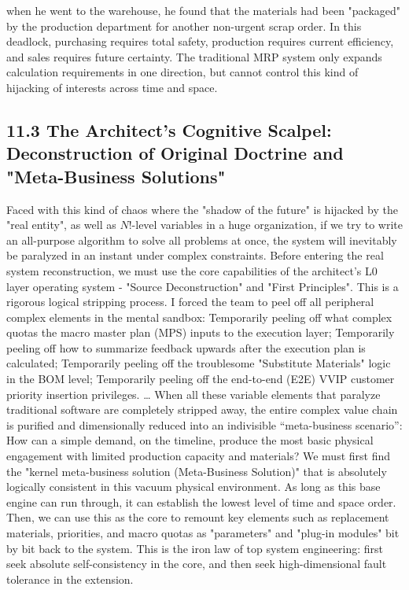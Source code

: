 \documentclass[11pt,a4paper]{article}
\begin{document}
when he went to the warehouse, he found that the materials had been "packaged" by the production department for another non-urgent scrap order. In this deadlock, purchasing requires total safety, production requires current efficiency, and sales requires future certainty. The traditional MRP system only expands calculation requirements in one direction, but cannot control this kind of hijacking of interests across time and space.


\subsection*{11.3 The Architect's Cognitive Scalpel: Deconstruction of Original Doctrine and "Meta-Business Solutions"}


Faced with this kind of chaos where the "shadow of the future" is hijacked by the "real entity", as well as $N!$-level variables in a huge organization, if we try to write an all-purpose algorithm to solve all problems at once, the system will inevitably be paralyzed in an instant under complex constraints. Before entering the real system reconstruction, we must use the core capabilities of the architect's L0 layer operating system - "Source Deconstruction" and "First Principles". This is a rigorous logical stripping process. I forced the team to peel off all peripheral complex elements in the mental sandbox: Temporarily peeling off what complex quotas the macro master plan (MPS) inputs to the execution layer; Temporarily peeling off how to summarize feedback upwards after the execution plan is calculated; Temporarily peeling off the troublesome "Substitute Materials" logic in the BOM level; Temporarily peeling off the end-to-end (E2E) VVIP customer priority insertion privileges. … When all these variable elements that paralyze traditional software are completely stripped away, the entire complex value chain is purified and dimensionally reduced into an indivisible “meta-business scenario”: How can a simple demand, on the timeline, produce the most basic physical engagement with limited production capacity and materials? We must first find the "kernel meta-business solution (Meta-Business Solution)" that is absolutely logically consistent in this vacuum physical environment. As long as this base engine can run through, it can establish the lowest level of time and space order. Then, we can use this as the core to remount key elements such as replacement materials, priorities, and macro quotas as "parameters" and "plug-in modules" bit by bit back to the system. This is the iron law of top system engineering: first seek absolute self-consistency in the core, and then seek high-dimensional fault tolerance in the extension.
\end{document}

